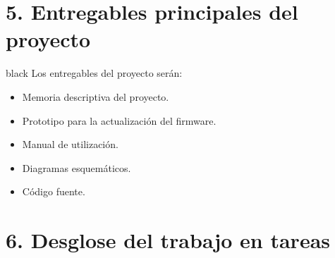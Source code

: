 \documentclass[11pt]{charter}
\begin{document}
\section{5. Entregables principales del proyecto}
\label{sec:entregables}

\begin{consigna}{black}
Los entregables del proyecto serán:
\begin{itemize}
\item Memoria descriptiva del proyecto.
\item Prototipo para la actualización del firmware.
\item Manual de utilización.
\item Diagramas esquemáticos.
\item Código fuente.

\end{itemize}

\end{consigna}

\section{6. Desglose del trabajo en tareas}
\label{sec:wbs}
\end{document}
